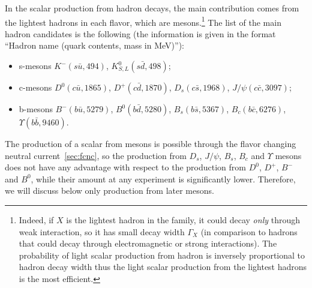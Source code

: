 \documentclass[a4paper,12pt,dvipsnames,usernames]{article}
\begin{document}
In the scalar production from hadron decays, the main contribution comes from the lightest hadrons in each flavor, which are mesons.\footnote{Indeed, if $X$ is the lightest hadron in the family, it could decay \textit{only} through weak interaction, so it has small decay width $\Gamma_X$ (in comparison to hadrons that could decay through electromagnetic or strong interactions). The probability of light scalar production from hadron is inversely proportional to hadron decay width thus the light scalar production from the lightest hadrons is the most efficient.} The list of the main hadron candidates is the following (the information is given in the format ``Hadron name (quark contents, mass in MeV)''):
\begin{itemize}
    \item s-mesons $K^-(s\bar{u}, 494)$, $K^0_{S,L}(s\bar{d}, 498)$;
    \item c-mesons $D^0(c\bar{u},1865)$, $D^+(c\bar{d},1870)$, $D_s(c\bar{s},1968)$, $J/\psi(c\bar{c},3097)$;
    \item b-mesons $B^-(b\bar{u},5279)$, $B^0(b\bar{d},5280)$, 
    $B_s (b\bar{s},5367)$, $B_c (b\bar{c},6276)$, $\Upsilon (b\bar{b},9460)$.
\end{itemize}
The production of a scalar from mesons is possible through the flavor changing neutral current~\ref{sec:fcnc}, so the production from $D_s$, $J/\psi$, $B_s$, $B_c$ and $\Upsilon$ mesons does not have any advantage with respect to the production from $D^0$, $D^+$, $B^-$ and $B^0$, while their amount at any experiment is significantly lower. Therefore, we will discuss below only production from later mesons.
\end{document}

